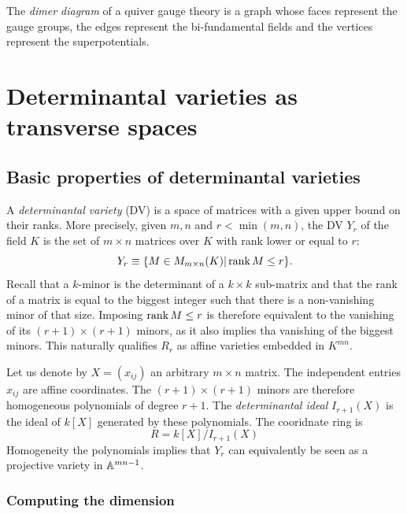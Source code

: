     The \emph{dimer diagram} of a quiver gauge theory is a graph whose faces represent the gauge groups, the edges represent the bi-fundamental fields and the vertices represent the superpotentials.

\section{Determinantal varieties as transverse spaces}

    \subsection{Basic properties of determinantal varieties}  

            A \emph{determinantal variety} (DV) is a space of matrices with a given upper bound on their ranks. More precisely, given $m,n$ and $r<\min(m,n)$, the DV $Y_r$ of the field $K$ is the set of $m\times n$ matrices over $K$ with rank lower or equal to $r$:
            \begin{equation}
                Y_r\equiv\{M\in M_{m\times n}(K)|\rank M\leq r\}.
            \end{equation}
            Recall that a $k$-minor is the determinant of a $k\times k$ sub-matrix and that the rank of a matrix is equal to the biggest integer such that there is a non-vanishing minor of that size. Imposing $\rank M\leq r$ is therefore equivalent to the vanishing of its $(r+1)\times (r+1)$ minors, as it also implies tha vanishing of the biggest minors. This naturally qualifies $R_r$ as affine varieties embedded in $K^{mn}$. 
            
            Let us denote by $X=(x_{ij})$ an arbitrary $m\times n$ matrix. The independent entries $x_{ij}$ are affine coordinates. The $(r+1)\times(r+1)$ minors are therefore homogeneous polynomials of degree $r+1$. The \emph{determinantal ideal} $I_{r+1}(X)$ is the ideal of $k[X]$ generated by these polynomials. The cooridnate ring is 
            \begin{equation}
                R=k[X]/I_{r+1}(X)
            \end{equation}
            Homogeneity the polynomials implies that $Y_r$ can equivalently be seen as a projective variety in $\mathbb{A}^{mn-1}$.

        \subsubsection{Computing the dimension}
            
